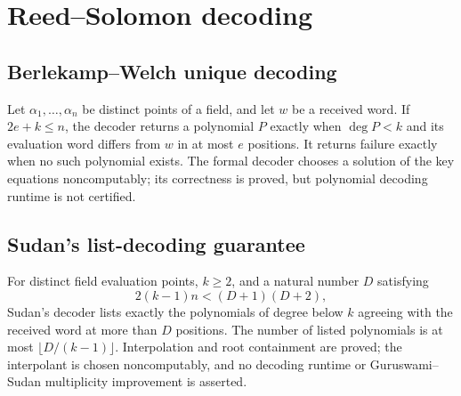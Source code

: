 \section{Reed--Solomon decoding}

\begin{result}
\subsection{Berlekamp--Welch unique decoding}
Let $\alpha_1,\ldots,\alpha_n$ be distinct points of a field, and let $w$ be a
received word. If $2e+k\le n$, the decoder returns a polynomial $P$ exactly when
$\deg P<k$ and its evaluation word differs from $w$ in at most $e$ positions.
It returns failure exactly when no such polynomial exists. The formal decoder
chooses a solution of the key equations noncomputably; its correctness is proved,
but polynomial decoding runtime is not certified.\citep{WelchBerlekamp1986,GuruswamiRudraSudan2019}
\end{result}

\begin{result}
\subsection{Sudan's list-decoding guarantee}
For distinct field evaluation points, $k\ge2$, and a natural number $D$ satisfying
\[
2(k-1)n<(D+1)(D+2),
\]
Sudan's decoder lists exactly the polynomials of degree below $k$ agreeing with
the received word at more than $D$ positions. The number of listed polynomials
is at most $\lfloor D/(k-1)\rfloor$. Interpolation and root containment are proved;
the interpolant is chosen noncomputably, and no decoding runtime or
Guruswami--Sudan multiplicity improvement is asserted.\citep{Sudan1997,GuruswamiRudraSudan2019}
\end{result}
